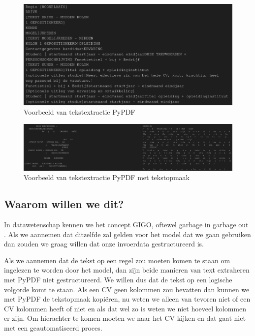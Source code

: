 \documentclass{article}
\begin{document}
\begin{figure}[ht]
  \begin{center}
    \includegraphics[width=\linewidth]{img/voorbeeld_pypdf_text_extract_geen_layout.png}
  \end{center}
  \caption{Voorbeeld van tekstextractie PyPDF}
  \label{fig:pypdf-no-layout}
\end{figure}

\begin{figure}[ht]
  \begin{center}
    \includegraphics[width=\linewidth]{img/voorbeeld_pypdf_text_extract_layout.png}
  \end{center}
  \caption{Voorbeeld van tekstextractie PyPDF met tekstopmaak}
  \label{fig:pypdf-w-layout}
\end{figure}

\vfill

\subsection{Waarom willen we dit?}

In datawetenschap kennen we het concept GIGO, oftewel garbage in garbage out
\cite{merriam-webster-no-date}. Als we aannemen dat ditzelfde zal gelden voor
het model dat we gaan gebruiken dan zouden we graag willen dat onze invoerdata
gestructureerd is.

Als we aannemen dat de tekst op een regel zou moeten komen te staan om ingelezen
te worden door het model, dan zijn beide manieren van text extraheren met PyPDF
niet gestructureerd. We willen dus dat de tekst op een logische volgorde komt te
staan. Als een CV geen kolommen zou bevatten dan kunnen we met PyPDF de
tekstopmaak kopiëren, nu weten we alleen van tevoren niet of een CV kolommen
heeft of niet en als dat wel zo is weten we niet hoeveel kolommen er zijn. Om
hierachter te komen moeten we naar het CV kijken en dat gaat niet met een
geautomatiseerd proces.
\end{document}
